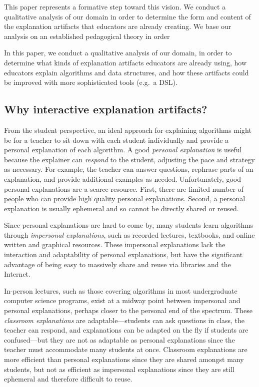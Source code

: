 \documentclass[conference]{IEEEtran}
\begin{document}
This paper represents a formative step toward this vision. We conduct a
qualitative analysis of our domain in order to determine the form and content
of the explanation artifacts that educators are already creating. We base our
analysis on an established pedagogical theory in order 

In this paper, we conduct a qualitative analysis of our domain, in order to
determine what kinds of explanation artifacts educators are already using, how
educators explain algorithms and data structures, and how these artifacts could
be improved with more sophisticated tools (e.g.\ a DSL).



\subsection{Why interactive explanation artifacts?}
\label{sec:artifacts}

From the student perspective, an ideal approach for explaining algorithms might
be for a teacher to sit down with each student individually and provide a
personal explanation of each algorithm. A good \emph{personal explanation} is
useful because the explainer can \emph{respond} to the student, adjusting the
pace and strategy as necessary. For example, the teacher can answer questions,
rephrase parts of an explanation, and provide additional examples as needed.
%
Unfortunately, good personal explanations are a scarce resource. First, there
are limited number of people who can provide high quality personal
explanations. Second, a personal explanation is usually ephemeral and so cannot
be directly shared or reused.


Since personal explanations are hard to come by, many students learn algorithms
through \emph{impersonal explanations}, such as recorded lectures, textbooks,
and online written and graphical resources.
%
These impersonal explanations lack the interaction and adaptability of personal
explanations, but have the significant advantage of being easy to massively
share and reuse via libraries and the Internet.


In-person lectures, such as those covering algorithms in most undergraduate
computer science programs, exist at a midway point between impersonal and
personal explanations, perhaps closer to the personal end of the spectrum.
These \emph{classroom explanations} are adaptable---students can ask questions
in class, the teacher can respond, and explanations can be adapted on the fly
if students are confused---but they are not as adaptable as personal
explanations since the teacher must accommodate many students at once.
Classroom explanations are more efficient than personal explanations since they
are shared amongst many students, but not as efficient as impersonal
explanations since they are still ephemeral and therefore difficult to reuse.
\end{document}
